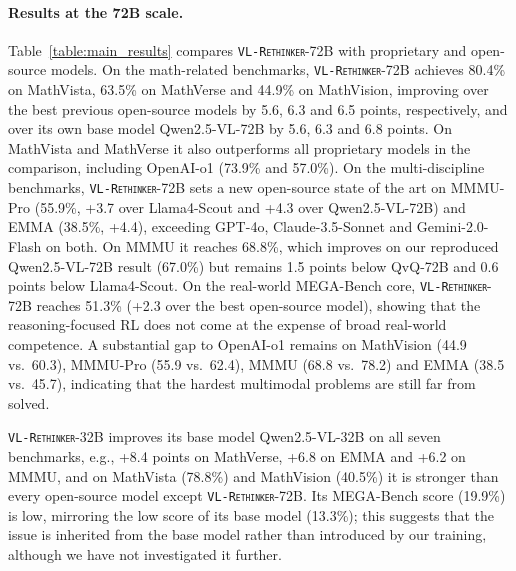 \documentclass{article}
\newcommand{\model}{\texttt{\textsc{VL-Rethinker}}\xspace}
\begin{document}
\paragraph{Results at the 72B scale.} Table~\ref{table:main_results} compares \model-72B with proprietary and open-source models. On the math-related benchmarks, \model-72B achieves 80.4\% on MathVista, 63.5\% on MathVerse and 44.9\% on MathVision, improving over the best previous open-source models by 5.6, 6.3 and 6.5 points, respectively, and over its own base model Qwen2.5-VL-72B by 5.6, 6.3 and 6.8 points. On MathVista and MathVerse it also outperforms all proprietary models in the comparison, including OpenAI-o1 (73.9\% and 57.0\%). On the multi-discipline benchmarks, \model-72B sets a new open-source state of the art on MMMU-Pro (55.9\%, +3.7 over Llama4-Scout and +4.3 over Qwen2.5-VL-72B) and EMMA (38.5\%, +4.4), exceeding GPT-4o, Claude-3.5-Sonnet and Gemini-2.0-Flash on both. On MMMU it reaches 68.8\%, which improves on our reproduced Qwen2.5-VL-72B result (67.0\%) but remains 1.5 points below QvQ-72B and 0.6 points below Llama4-Scout. On the real-world MEGA-Bench core, \model-72B reaches 51.3\% (+2.3 over the best open-source model), showing that the reasoning-focused RL does not come at the expense of broad real-world competence. A substantial gap to OpenAI-o1 remains on MathVision (44.9 vs.\ 60.3), MMMU-Pro (55.9 vs.\ 62.4), MMMU (68.8 vs.\ 78.2) and EMMA (38.5 vs.\ 45.7), indicating that the hardest multimodal problems are still far from solved.

\model-32B improves its base model Qwen2.5-VL-32B on all seven benchmarks, e.g., +8.4 points on MathVerse, +6.8 on EMMA and +6.2 on MMMU, and on MathVista (78.8\%) and MathVision (40.5\%) it is stronger than every open-source model except \model-72B. Its MEGA-Bench score (19.9\%) is low, mirroring the low score of its base model (13.3\%); this suggests that the issue is inherited from the base model rather than introduced by our training, although we have not investigated it further.
\end{document}
